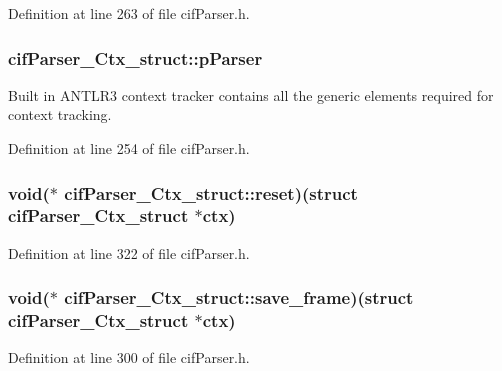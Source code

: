 Definition at line 263 of file cif\-Parser.\-h.

\hypertarget{structcif_parser___ctx__struct_ab6328678e99374c82ab1a70821cba7a2}{
\subsubsection[{p\-Parser}]{ cif\-Parser\-\_\-\-Ctx\-\_\-struct\-::p\-Parser}}\label{structcif_parser___ctx__struct_ab6328678e99374c82ab1a70821cba7a2}
Built in A\-N\-T\-L\-R3 context tracker contains all the generic elements required for context tracking. 

Definition at line 254 of file cif\-Parser.\-h.

\hypertarget{structcif_parser___ctx__struct_affe2b6f7d8b3c2c9272b03f2df894302}{
\subsubsection[{reset}]{\setlength{\rightskip}{0pt plus 5cm}void($\ast$ cif\-Parser\-\_\-\-Ctx\-\_\-struct\-::reset)(struct {\bf cif\-Parser\-\_\-\-Ctx\-\_\-struct} $\ast$ctx)}}\label{structcif_parser___ctx__struct_affe2b6f7d8b3c2c9272b03f2df894302}


Definition at line 322 of file cif\-Parser.\-h.

\hypertarget{structcif_parser___ctx__struct_acf04cb95815c5fca16863bf3bdc0c2e1}{
\subsubsection[{save\-\_\-frame}]{\setlength{\rightskip}{0pt plus 5cm}void($\ast$ cif\-Parser\-\_\-\-Ctx\-\_\-struct\-::save\-\_\-frame)(struct {\bf cif\-Parser\-\_\-\-Ctx\-\_\-struct} $\ast$ctx)}}\label{structcif_parser___ctx__struct_acf04cb95815c5fca16863bf3bdc0c2e1}


Definition at line 300 of file cif\-Parser.\-h.

